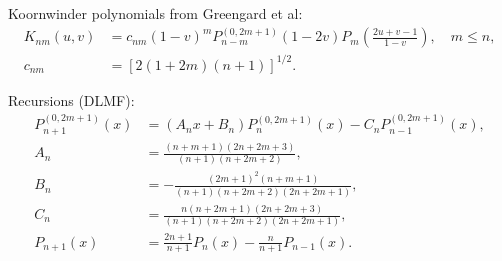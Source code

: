 \documentclass[a4paper,12pt]{article}
\begin{document}
Koornwinder polynomials from Greengard et al:
\begin{align}
  \label{equ:koornwinder:1}
  K_{nm}(u,v)
  &=
    c_{nm}(1-v)^{m}
    P_{n-m}^{(0,2m+1)}(1-2v)
    P_{m}
    \left(
    \frac{2u+v-1}{1-v}
  \right), \quad m\leq n,\\
  c_{nm} &=
  \left[
    2(1+2m)(n+1)
  \right]^{1/2}.
\end{align}

Recursions (DLMF):
\begin{align}
  \label{equ:jacobi:1}
  P_{n+1}^{(0,2m+1)}(x)
  &=
    (A_{n}x + B_{n})P_{n}^{(0,2m+1)}(x) -
    C_{n}P_{n-1}^{(0,2m+1)}(x),\\
  A_{n} &= \frac{(n+m+1)(2n+2m+3)}{(n+1)(n+2m+2)},\\
  B_{n} &= -\frac{(2m+1)^{2}(n+m+1)}{(n+1)(n+2m+2)(2n+2m+1)},\\
  C_{n} &= \frac{n(n+2m+1)(2n+2m+3)}{(n+1)(n+2m+2)(2n+2m+1)},\\
  \label{equ:legendre}
  P_{n+1}(x)
  &=
    \frac{2n+1}{n+1}P_{n}(x) - \frac{n}{n+1}P_{n-1}(x).
\end{align}
\end{document}
